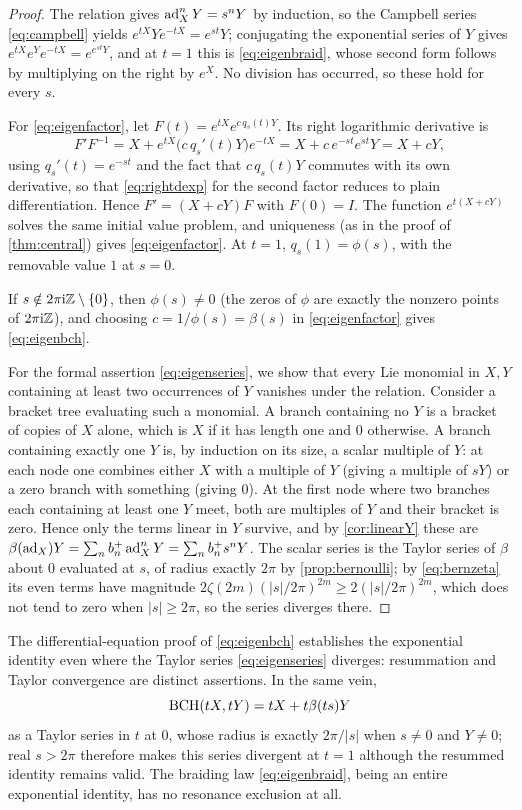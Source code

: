 \begin{proof}
The relation gives $\operatorname{ad}_X^nY=s^nY$ by induction, so the Campbell series
\eqref{eq:campbell} yields $e^{tX}Ye^{-tX}=e^{st}Y$; conjugating the
exponential series of $Y$ gives $e^{tX}e^{Y}e^{-tX}=e^{e^{st}Y}$, and at
$t=1$ this is \eqref{eq:eigenbraid}, whose second form follows by
multiplying on the right by $e^X$. No division has occurred, so these hold
for every $s$.

For \eqref{eq:eigenfactor}, let $F(t)=e^{tX}e^{c\,q_s(t)Y}$. Its right
logarithmic derivative is
\[
 F'F^{-1}=X+e^{tX}\bigl(c\,q_s'(t)Y\bigr)e^{-tX}=X+c\,e^{-st}e^{st}Y=X+cY,
\]
using $q_s'(t)=e^{-st}$ and the fact that $c\,q_s(t)Y$ commutes with its
own derivative, so that \eqref{eq:rightdexp} for the second factor reduces
to plain differentiation. Hence $F'=(X+cY)F$ with $F(0)=I$. The function
$e^{t(X+cY)}$ solves the same initial value problem, and uniqueness (as in
the proof of \cref{thm:central}) gives \eqref{eq:eigenfactor}. At $t=1$,
$q_s(1)=\phi(s)$, with the removable value $1$ at $s=0$.

If $s\notin2\pi\mathrm{i}\mathbb{Z}\setminus\{0\}$, then $\phi(s)\neq0$ (the zeros of
$\phi$ are exactly the nonzero points of $2\pi\mathrm{i}\mathbb{Z}$), and choosing
$c=1/\phi(s)=\beta(s)$ in \eqref{eq:eigenfactor} gives \eqref{eq:eigenbch}.

For the formal assertion \eqref{eq:eigenseries}, we show that every Lie
monomial in $X,Y$ containing at least two occurrences of $Y$ vanishes under
the relation. Consider a bracket tree evaluating such a monomial. A branch
containing no $Y$ is a bracket of copies of $X$ alone, which is $X$ if it
has length one and $0$ otherwise. A branch containing exactly one $Y$ is,
by induction on its size, a scalar multiple of $Y$: at each node one
combines either $X$ with a multiple of $Y$ (giving a multiple of $sY$) or a
zero branch with something (giving $0$). At the first node where two
branches each containing at least one $Y$ meet, both are multiples of $Y$
and their bracket is zero. Hence only the terms linear in $Y$ survive, and
by \cref{cor:linearY} these are $\beta(\operatorname{ad}_X)Y=\sum_nb^{+}_{n}\operatorname{ad}_X^nY
=\sum_nb^{+}_{n}s^nY$. The scalar series is the Taylor series of $\beta$ about $0$
evaluated at $s$, of radius exactly $2\pi$ by \cref{prop:bernoulli}; by
\eqref{eq:bernzeta} its even terms have magnitude
$2\zeta(2m)(|s|/2\pi)^{2m}\geq2(|s|/2\pi)^{2m}$, which does not tend to
zero when $|s|\geq2\pi$, so the series diverges there.
\end{proof}
The differential-equation proof of \eqref{eq:eigenbch} establishes the
exponential identity even where the Taylor series \eqref{eq:eigenseries}
diverges: resummation and Taylor convergence are distinct assertions. In
the same vein,
\begin{equation}\label{eq:eigenscaled}
 \operatorname{BCH}(tX,tY)=tX+t\beta(ts)Y
\end{equation}
as a Taylor series in $t$ at $0$, whose radius is exactly $2\pi/|s|$ when
$s\neq0$ and $Y\neq0$; real $s>2\pi$ therefore makes this series divergent
at $t=1$ although the resummed identity remains valid. The braiding law
\eqref{eq:eigenbraid}, being an entire exponential identity, has no
resonance exclusion at all.

